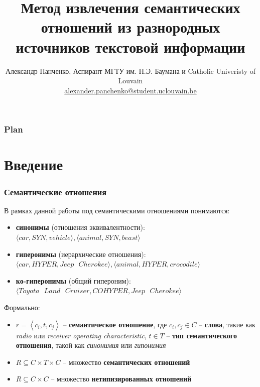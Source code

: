 \documentclass{beamer}
\title[\insertframenumber/\inserttotalframenumber]
{Метод извлечения семантических отношений из разнородных источников текстовой информации }
\author[Александр Панченко]
{Александр Панченко, Аспирант МГТУ им. Н.Э. Баумана и Catholic Univeristy of Louvain \\ {\scriptsize \url{alexander.panchenko@student.uclouvain.be} }}
\begin{document}
\begin{frame}
  \titlepage
\end{frame}

\begin{frame}
  \setcounter{tocdepth}{1}
  \frametitle{Plan}
  \tableofcontents
  \setcounter{tocdepth}{2}
	
\end{frame}

\section{Введение}

\begin{frame}
\frametitle{Семантические отношения}
В рамках данной работы под семантическими отношениями понимаются: 
\begin{itemize}
\item \textbf{синонимы} (отношения эквивалентности): $\langle car,SYN,vehicle \rangle, \langle animal,SYN,beast \rangle$ 
\item \textbf{гиперонимы} (иерархические отношения): $\langle car,HYPER,Jeep \text{ } Cherokee \rangle, \langle animal,HYPER, crocodile \rangle$
\item \textbf{ко-гиперонимы} (общий гипероним):
$\langle Toyota \text{ } Land  \text{ }Cruiser,COHYPER,Jeep \text{ } Cherokee \rangle$
\end{itemize}

Формально:
\begin{itemize}
	
		\item $r=\left\langle   c_i,t,c_j \right\rangle$ -- \textbf{семантическое отношение},  где $c_i,c_j \in C$ -- \textbf{слова}, такие как \textit{radio} или \textit{receiver operating characteristic},  $t \in T$ -- \textbf{тип семантического отношения}, такой как \textit{синонимия} или \textit{гипонимия}
	\item  $R \subseteq C \times T \times C$ -- множество \textbf{семантических отношений} 
	\item  $R \subseteq C \times C$ -- множество \textbf{нетипизированных отношений} 
	
\end{itemize}

\end{frame}
\end{document}
